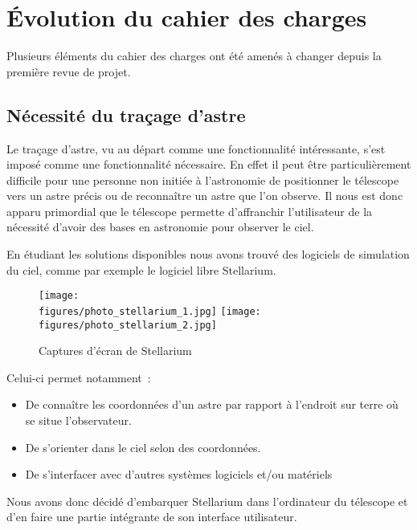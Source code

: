 \chapter{Évolution du cahier des charges}
\label{chapter1}

Plusieurs éléments du cahier des charges ont été amenés à changer depuis la première revue de projet.

\section{Nécessité du traçage d'astre}

Le traçage d'astre, vu au départ comme une fonctionnalité intéressante, s'est imposé comme une fonctionnalité nécessaire. En effet il peut être particulièrement difficile pour une personne non initiée à l'astronomie de positionner le télescope vers un astre précis ou de reconnaître un astre que l'on observe. Il nous est donc apparu primordial que le télescope permette d'affranchir l'utilisateur de la nécessité d'avoir des bases en astronomie pour observer le ciel.

\vspace{1cm}

En étudiant les solutions disponibles nous avons trouvé des logiciels de simulation du ciel, comme par exemple le logiciel libre Stellarium.

\begin{figure}[H]
    \centering
    \texttt{[image: \\figures/photo\_stellarium\_1.jpg]}
	\texttt{[image: \\figures/photo\_stellarium\_2.jpg]}
    \decoRule
    \caption[
    Captures d'écran de Stellarium]{
    Captures d'écran de Stellarium}
    \label{fig:Captures d'écran de Stellarium}
    \end{figure}

\vspace{1cm}

Celui-ci permet notamment~:
\begin{itemize}[label=$\bullet$]
	\item De connaître les coordonnées d'un astre par rapport à l'endroit sur terre où se situe l'observateur.
	\item De s'orienter dans le ciel selon des coordonnées.
	\item De s'interfacer avec d'autres systèmes logiciels et/ou matériels
	\end{itemize}

Nous avons donc décidé d'embarquer Stellarium dans l'ordinateur du télescope et d'en faire une partie intégrante de son interface utilisateur.

